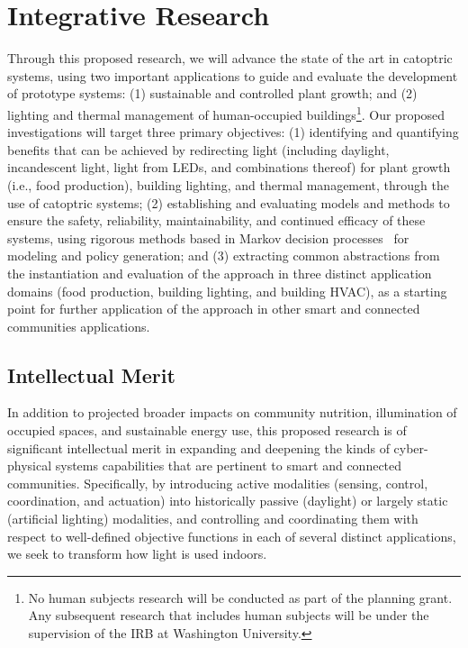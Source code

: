 \section{Integrative Research}
\label{sec:research}

Through this proposed research, we will advance the state of the art in
catoptric systems, using two important applications to guide and evaluate the
development of prototype systems: (1) sustainable and controlled plant growth;
and (2) lighting
and thermal management of human-occupied buildings\footnote{No human subjects
research will be conducted as part of the planning grant. Any subsequent
research
that includes human subjects will be under the supervision of the IRB at
Washington University.}.
Our proposed investigations
will target three primary objectives: (1) identifying and quantifying benefits
that can be achieved by redirecting light (including daylight, incandescent
light, light from LEDs, and combinations thereof) for 
plant growth (i.e., food production),
building lighting, and thermal management, through the use of
catoptric systems; (2) establishing and evaluating models and methods to ensure
the safety, reliability, maintainability, and continued efficacy of these
systems, using rigorous methods based in Markov decision
processes~\cite{puterman} for modeling
and policy generation; and (3) extracting common abstractions from the
instantiation and evaluation of the approach in three distinct application
domains (food production, building lighting, and building HVAC), as a starting
point for further application of the approach in other smart and connected
communities applications.

\subsection{Intellectual Merit}
\label{sec:im}

In addition to projected broader impacts on community nutrition, illumination
of occupied spaces, and sustainable energy use, this proposed research is of
significant intellectual merit in expanding and deepening the kinds of
cyber-physical systems capabilities that are pertinent to smart and connected
communities. Specifically, by introducing active modalities (sensing, control,
coordination, and actuation) into historically passive (daylight) or largely
static (artificial lighting) modalities, and controlling and coordinating them
with respect to well-defined objective functions in each of several distinct
applications, we seek to transform how light is used indoors.  

